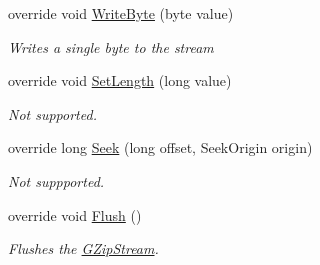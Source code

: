 \begin{DoxyCompactItemize}
override void \hyperlink{class_dot_z_lib_1_1_g_zip_stream_a78b38035956f42bf1c66db34ec2ba2cc}{Write\+Byte} (byte value)
\begin{DoxyCompactList}\small\item\em Writes a single byte to the stream \end{DoxyCompactList}\item 
override void \hyperlink{class_dot_z_lib_1_1_g_zip_stream_a05fff98b765251f87b41318781da71c4}{Set\+Length} (long value)
\begin{DoxyCompactList}\small\item\em Not supported. \end{DoxyCompactList}\item 
override long \hyperlink{class_dot_z_lib_1_1_g_zip_stream_adbb50684c05ca060cff804c91c63f4a2}{Seek} (long offset, Seek\+Origin origin)
\begin{DoxyCompactList}\small\item\em Not suppported. \end{DoxyCompactList}\item 
override void \hyperlink{class_dot_z_lib_1_1_g_zip_stream_a1e219fd4cc6c0f3c3bbd373f9724e24e}{Flush} ()
\begin{DoxyCompactList}\small\item\em Flushes the {\ttfamily \hyperlink{class_dot_z_lib_1_1_g_zip_stream}{G\+Zip\+Stream}}. \end{DoxyCompactList}\end{DoxyCompactItemize}
